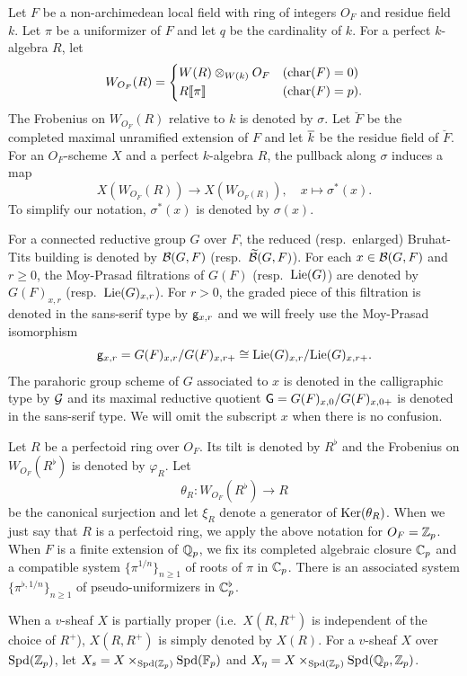 \documentclass[12pt,reqno]{amsart}
\begin{document}
Let $F$ be a non-archimedean local field with ring of integers $O_F$ and residue field $k$. Let $\pi$ be a uniformizer of $F$ and let $q$ be the cardinality of $k$. For a perfect $k$-algebra $R$, let 
\[  
    W_{O_F}(R)= \left\{ \begin{alignedat}{4}
        & W(R) \otimes_{W(k)} O_F & \quad & ({\mathrm{char}}(F) = 0) \\
        & R\llbracket \pi \rrbracket & \quad & ({\mathrm{char}}(F) = p). 
    \end{alignedat} \right.
\]
The Frobenius on $W_{O_F}(R)$ relative to $k$ is denoted by $\sigma$. Let $\breve{F}$ be the completed maximal unramified extension of $F$ and let ${\overline{k}}$ be the residue field of $\breve{F}$. For an $O_F$-scheme $X$ and a perfect $k$-algebra $R$, the pullback along $\sigma$ induces a map 
\[
    X(W_{O_F}(R)) \to X(W_{O_F(R)}) ,\quad x \mapsto \sigma^*(x). 
\]
To simplify our notation, $\sigma^*(x)$ is denoted by $\sigma(x)$. 

For a connected reductive group $G$ over $F$, the reduced (resp.\ enlarged) Bruhat-Tits building is denoted by ${\mathcal{B}}(G, F)$ (resp.\ ${\mathcal{{\widetilde{B}}}}(G, F)$). For each $x \in {\mathcal{B}}(G, F)$ and $r \geq 0$, the Moy-Prasad filtrations of $G(F)$ (resp.\ ${\operatorname{Lie}}(G)$) are denoted by $G(F)_{x, r}$ (resp.\ ${\operatorname{Lie}}(G)_{x, r}$). For $r > 0$, the graded piece of this filtration is denoted in the sans-serif type by ${\mathsf{g}}_{x, r}$ and we will freely use the Moy-Prasad isomorphism 
\[
    {\mathsf{g}}_{x, r} = G(F)_{x, r} / G(F)_{x, r+} \cong {\operatorname{Lie}}(G)_{x, r} / {\operatorname{Lie}}(G)_{x, r+}. 
\]
The parahoric group scheme of $G$ associated to $x$ is denoted in the calligraphic type by ${\mathcal{G}}$ and its maximal reductive quotient ${\mathsf{G}} = G(F)_{x, 0} / G(F)_{x, 0+}$ is denoted in the sans-serif type. We will omit the subscript $x$ when there is no confusion. 

Let $R$ be a perfectoid ring over $O_F$. Its tilt is denoted by $R^\flat$ and the Frobenius on $W_{O_F}(R^\flat)$ is denoted by $\varphi_R$. Let
\[
    \theta_R\colon W_{O_F}(R^\flat)\to R
\]
be the canonical surjection and let $\xi_R$ denote a generator of ${\operatorname{Ker}}(\theta_R)$. When we just say that $R$ is a perfectoid ring, we apply the above notation for $O_F = \mathbb{Z}_p$. When $F$ is a finite extension of $\mathbb{Q}_p$, we fix its completed algebraic closure $\mathbb{C}_p$ and a compatible system $\{\pi^{1 / n}\}_{n \geq 1}$ of roots of $\pi$ in $\mathbb{C}_p$. There is an associated system $\{ \pi^{\flat, 1 / n} \}_{n \geq 1}$ of pseudo-uniformizers in $\mathbb{C}_p^\flat$. 

When a $v$-sheaf $X$ is partially proper (i.e.\ $X(R, R^+)$ is independent of the choice of $R^+$), $X(R, R^+)$ is simply denoted by $X(R)$. For a $v$-sheaf $X$ over ${\operatorname{Spd}}(\mathbb{Z}_p)$, let $X_s = X \times_{{\operatorname{Spd}}(\mathbb{Z}_p)} {\operatorname{Spd}}(\mathbb{F}_p)$ and $X_\eta = X \times_{{\operatorname{Spd}}(\mathbb{Z}_p)} {\operatorname{Spd}}(\mathbb{Q}_p, \mathbb{Z}_p)$. 
\end{document}
